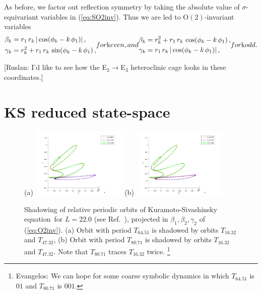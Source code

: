 \documentclass[aip,cha,showpacs,twocolumn,
 		  reprint]{revtex4-1} %
\newcommand{\bseq}{\begin{subequations}}
\newcommand{\eseq}{\end{subequations}}
\newcommand{\refref} [1] {Ref.~\onlinecite{#1}}
\newcommand{\refeq}  [1] {(\ref{#1})}
\newcommand{\KSe}{Kuramoto-Siva\-shin\-sky equation}
\newcommand{\On}[1]{\ensuremath{\textrm{O}(#1)}}
\newcommand{\Refl}{\ensuremath{\sigma}}
\newcommand{\ES}[1]{\footnote{Evangelos: #1}}
\begin{document}
As before, we factor out reflection symmetry by taking the absolute value
of $\Refl$-equivariant variables in \refeq{eq:SO2inv}.
Thus we are led to $\On{2}$-invariant variables
\bseq\label{eq:O2inv}
  \begin{align}
    \beta_k &=
		    r_1\,r_k\, |\cos(\phi_k-k\,\phi_1)|\,, \\
    \gamma_k &=
		    r_k^2+r_1\,r_k\,\sin(\phi_k-k\,\phi_1)\,,
  \end{align}
for $k$ even, and
  \begin{align}
    \beta_k &=
		    r_k^2+r_1\,r_k\, \cos(\phi_k-k\,\phi_1)\,, \\
    \gamma_k &=
		    r_1\,r_k\, |\cos(\phi_k-k\,\phi_1)|\,,
  \end{align}
for $k$ odd.
\eseq

[Ruslan: I'd like to see how the E$_2 \to $E$_3$ heteroclinic cage looks in these coordinates.]

\section{KS reduced state-space}

\begin{figure}
 (a)~\includegraphics[width=0.40\textwidth]{../figs/ks22rpo_shad1}
 (b)~\includegraphics[width=0.40\textwidth]{../figs/ks22rpo_shad2}
\caption{
 Shadowing of relative periodic orbits of \KSe\ for $L=22.0$ (see \refref{SCD07}),
projected in $\beta_1, \beta_2, \gamma_2$ of
\refeq{eq:O2inv}. (a) Orbit with period $T_{64.51}$ is shadowed by
orbits $T_{16.32}$ and $T_{47.32}$, (b) Orbit with period
$T_{80.71}$ is shadowed by orbits $T_{16.32}$ and $T_{47.32}$. Note
that $T_{80.71}$ traces $T_{16.32}$ twice.
\ES{We can hope for some coarse symbolic dynamics in which  $T_{64.51}$  is $01$ and
$T_{80.71}$ is $001$.}
}
\label{fig:rpo_shad}
\end{figure}
\end{document}
